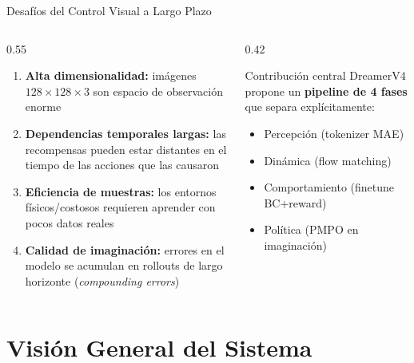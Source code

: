 \documentclass[aspectratio=169, 12pt]{beamer}
\begin{document}
\begin{frame}{Desafíos del Control Visual a Largo Plazo}
\begin{columns}[T]
  \begin{column}{0.55\textwidth}
    \begin{enumerate}
      \item \textbf{Alta dimensionalidad:} imágenes $128{\times}128{\times}3$ son espacio de observación enorme
      \vspace{6pt}
      \item \textbf{Dependencias temporales largas:} las recompensas pueden estar distantes en el tiempo de las acciones que las causaron
      \vspace{6pt}
      \item \textbf{Eficiencia de muestras:} los entornos físicos/costosos requieren aprender con pocos datos reales
      \vspace{6pt}
      \item \textbf{Calidad de imaginación:} errores en el modelo se acumulan en rollouts de largo horizonte (\emph{compounding errors})
    \end{enumerate}
  \end{column}
  \begin{column}{0.42\textwidth}
    \begin{alertblock}{Contribución central}
      DreamerV4 propone un \textbf{pipeline de 4 fases} que separa explícitamente:
      \begin{itemize}
        \item Percepción (tokenizer MAE)
        \item Dinámica (flow matching)
        \item Comportamiento (finetune BC+reward)
        \item Política (PMPO en imaginación)
      \end{itemize}
    \end{alertblock}
  \end{column}
\end{columns}
\end{frame}

\section{Visión General del Sistema}
\end{document}
